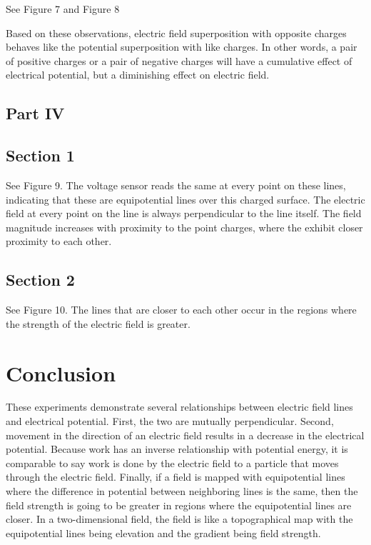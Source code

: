 \documentclass{article}
\begin{document}
See Figure 7 and Figure 8

Based on these observations, electric field superposition with opposite charges behaves like the potential
superposition with like charges. In other words, a pair of positive charges or a pair of negative charges
will have a cumulative effect of electrical potential, but a diminishing effect on electric field.


\subsection{Part IV}%
\label{sub:part_iv}

\subsection{Section 1}%
\label{sub:section_1}

See Figure 9. The voltage sensor reads the same at every point on these lines,
indicating that these are equipotential lines over this charged surface.
The electric field at every point on the line is always perpendicular to the line itself. The field magnitude
increases with proximity to the point charges, where the exhibit closer proximity to
each other.


\subsection{Section 2}%
\label{sub:section_2}

See Figure 10. The lines that are closer to each other occur in the regions
where the strength of the electric field is greater.



\section{Conclusion}%
\label{sec:conclusion}

These experiments demonstrate several relationships between electric field lines
and electrical potential. First, the two are mutually perpendicular.
Second, movement in the direction of an electric field results in
a decrease in the electrical potential. Because work has an inverse relationship
with potential energy, it is comparable to say work is done by the electric field
to a particle that moves through the electric field. Finally, if a field is mapped
with equipotential lines where the difference in potential between neighboring lines
is the same, then the field strength is going to be greater in regions where the
equipotential lines are closer. In a two-dimensional field, the field is like a
topographical map with the equipotential lines being elevation and the gradient being
field strength.
\end{document}
